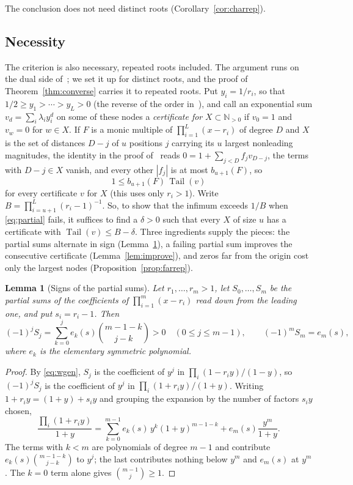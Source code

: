 \documentclass[11pt]{article}
\newtheorem{lemma}[theorem]{Lemma}
\theoremstyle{definition}
\theoremstyle{plain}
\newcommand{\N}{\mathbb N}
\DeclareMathOperator{\Tail}{Tail}
\begin{document}
The conclusion does not need distinct roots (Corollary~\ref{cor:charrep}).

\subsection*{Necessity}

The criterion is also necessary, repeated roots included.  The argument runs
on the dual side of~\cite[Lemma~3.1]{coefficient-mass}; we set it up for distinct roots, and the proof
of Theorem~\ref{thm:converse} carries it to repeated roots.  Put $y_i=1/r_i$, so that
$1/2\ge y_1>\cdots>y_L>0$ (the reverse of the order in~\cite[Theorem~2.2]{coefficient-mass}), and call an exponential sum
$v_d=\sum_i\lambda_iy_i^d$ on some of these nodes a \emph{certificate for}
$X\subset\N_{>0}$ if $v_0=1$ and $v_w=0$ for $w\in X$.  If $F$ is a monic
multiple of $\prod_{i=1}^L(x-r_i)$ of degree $D$ and $X$ is the set of
distances $D-j$ of $u$ positions $j$ carrying its $u$ largest nonleading
magnitudes, the identity in the proof of~\cite[Lemma~3.1]{coefficient-mass} reads
$0=1+\sum_{j<D}f_jv_{D-j}$, the terms with $D-j\in X$ vanish, and every other
$|f_j|$ is at most $b_{u+1}(F)$, so
\begin{equation}\label{eq:weak}
  1\le b_{u+1}(F)\,\Tail(v)
\end{equation}
for every certificate $v$ for $X$ (this uses only $r_i>1$).  Write
$B=\prod_{i=u+1}^L(r_i-1)^{-1}$.  So, to show that the infimum exceeds $1/B$ when \eqref{eq:partial}
fails, it suffices to find a $\delta>0$ such that every $X$ of size $u$ has a certificate with
$\Tail(v)\le B-\delta$.  Three ingredients supply the pieces: the partial
sums alternate in sign (Lemma~\ref{lem:signs}), a failing partial sum
improves the consecutive certificate (Lemma~\ref{lem:improve}), and zeros far
from the origin cost only the largest nodes
(Proposition~\ref{prop:farrep}).

\begin{lemma}[Signs of the partial sums]\label{lem:signs}
Let $r_1,\ldots,r_m>1$, let $S_0,\ldots,S_m$ be the partial sums of the
coefficients of $\prod_{i=1}^m(x-r_i)$ read down from the leading one, and put
$s_i=r_i-1$.  Then
\[
  (-1)^jS_j=\sum_{k=0}^{j}e_k(s)\binom{m-1-k}{j-k}>0\quad(0\le j\le m-1),
  \qquad (-1)^mS_m=e_m(s),
\]
where $e_k$ is the elementary symmetric polynomial.
\end{lemma}

\begin{proof}
By \eqref{eq:wgen}, $S_j$ is the coefficient of $y^j$ in
$\prod_i(1-r_iy)/(1-y)$, so $(-1)^jS_j$ is the coefficient of $y^j$ in
$\prod_i(1+r_iy)/(1+y)$.  Writing $1+r_iy=(1+y)+s_iy$ and grouping the
expansion by the number of factors $s_iy$ chosen,
\[
  \frac{\prod_i(1+r_iy)}{1+y}
  =\sum_{k=0}^{m-1}e_k(s)\,y^k(1+y)^{m-1-k}+e_m(s)\frac{y^m}{1+y}.
\]
The terms with $k<m$ are polynomials of degree $m-1$ and contribute
$e_k(s)\binom{m-1-k}{j-k}$ to $y^j$; the last contributes nothing below $y^m$
and $e_m(s)$ at $y^m$.  The $k=0$ term alone gives $\binom{m-1}{j}\ge1$.
\end{proof}
\end{document}
